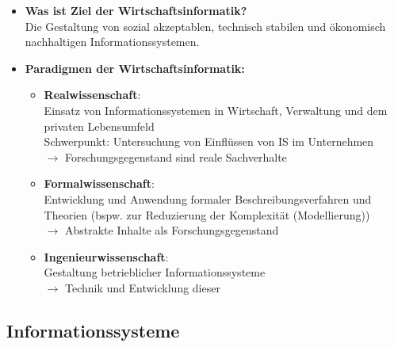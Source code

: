 \documentclass[12pt,a4paper]{article}
\begin{document}
\begin{itemize}
   \item \textbf{Was ist Ziel der Wirtschaftsinformatik?}\\
         Die Gestaltung von sozial akzeptablen, technisch stabilen und ökonomisch nachhaltigen Informationssystemen.
   
   \item \textbf{Paradigmen der Wirtschaftsinformatik:}
   \begin{itemize}
      \item \textbf{Realwissenschaft}: \\
            Einsatz von Informationssystemen in Wirtschaft, Verwaltung und dem privaten Lebensumfeld\\
            Schwerpunkt: Untersuchung von Einflüssen von IS im Unternehmen\\
            $\rightarrow$ Forschungsgegenstand sind reale Sachverhalte
      \item \textbf{Formalwissenschaft}: \\
            Entwicklung und Anwendung formaler Beschreibungsverfahren und Theorien 
            (bspw. zur Reduzierung der Komplexität (Modellierung))\\
            $\rightarrow$ Abstrakte Inhalte als Forschungsgegenstand
      \item \textbf{Ingenieurwissenschaft}: \\
            Gestaltung betrieblicher Informationssysteme\\
            $\rightarrow$ Technik und Entwicklung dieser
   \end{itemize}
\end{itemize}
 

\vspace{0.8cm}
\subsection{Informationssysteme} %
\end{document}
